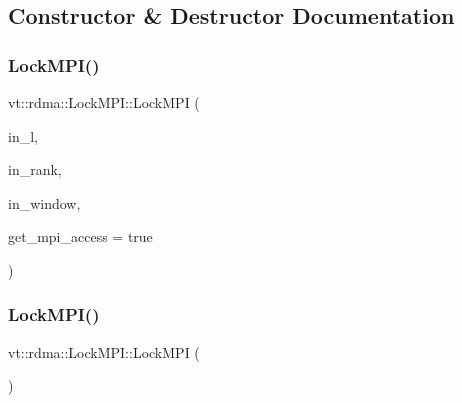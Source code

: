 \subsection{Constructor \& Destructor Documentation}
\mbox{\label{structvt_1_1rdma_1_1_lock_m_p_i_a5e1f07adc677f8d0d57e664ec1061fcc}} 
\subsubsection{\texorpdfstring{Lock\+M\+P\+I()}{LockMPI()}\hspace{0.1cm}{\footnotesize\ttfamily [1/3]}}
{\footnotesize\ttfamily vt\+::rdma\+::\+Lock\+M\+P\+I\+::\+Lock\+M\+PI (\begin{DoxyParamCaption}\item[{\hyperlink{namespacevt_1_1rdma_ac5c20b41a653e520b6305d4d454ecb70}{Lock}}]{in\+\_\+l,  }\item[{\hyperlink{namespacevt_a866da9d0efc19c0a1ce79e9e492f47e2}{vt\+::\+Node\+Type}}]{in\+\_\+rank,  }\item[{M\+P\+I\+\_\+\+Win}]{in\+\_\+window,  }\item[{bool}]{get\+\_\+mpi\+\_\+access = {\ttfamily true} }\end{DoxyParamCaption})\hspace{0.3cm}{\ttfamily [inline]}}

\mbox{\label{structvt_1_1rdma_1_1_lock_m_p_i_a82e24ca254c74bc236c1d46811b84310}} 
\subsubsection{\texorpdfstring{Lock\+M\+P\+I()}{LockMPI()}\hspace{0.1cm}{\footnotesize\ttfamily [2/3]}}
{\footnotesize\ttfamily vt\+::rdma\+::\+Lock\+M\+P\+I\+::\+Lock\+M\+PI (\begin{DoxyParamCaption}\item[{\hyperlink{structvt_1_1rdma_1_1_lock_m_p_i}{Lock\+M\+PI} const \&}]{ }\end{DoxyParamCaption})\hspace{0.3cm}{\ttfamily [delete]}}

